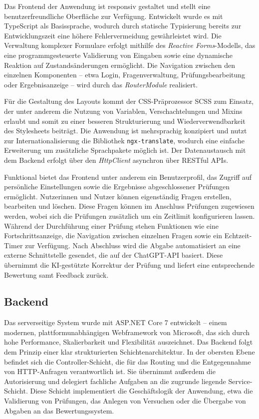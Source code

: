 \documentclass[a4paper,12pt]{article}
\begin{document}
Das Frontend der Anwendung ist responsiv gestaltet und stellt eine benutzerfreundliche Oberfläche zur Verfügung. Entwickelt wurde es mit TypeScript als Basissprache, wodurch durch statische Typisierung bereits zur Entwicklungszeit eine höhere Fehlervermeidung gewährleistet wird. Die Verwaltung komplexer Formulare erfolgt mithilfe des \textit{Reactive Forms}-Modells, das eine programmgesteuerte Validierung von Eingaben sowie eine dynamische Reaktion auf Zustandsänderungen ermöglicht. Die Navigation zwischen den einzelnen Komponenten – etwa Login, Fragenverwaltung, Prüfungsbearbeitung oder Ergebnisanzeige – wird durch das \textit{RouterModule} realisiert.

Für die Gestaltung des Layouts kommt der CSS-Präprozessor SCSS zum Einsatz, der unter anderem die Nutzung von Variablen, Verschachtelungen und Mixins erlaubt und somit zu einer besseren Strukturierung und Wiederverwendbarkeit des Stylesheets beiträgt. Die Anwendung ist mehrsprachig konzipiert und nutzt zur Internationalisierung die Bibliothek \texttt{ngx-translate}, wodurch eine einfache Erweiterung um zusätzliche Sprachpakete möglich ist. Der Datenaustausch mit dem Backend erfolgt über den \textit{HttpClient} asynchron über RESTful APIs.

Funktional bietet das Frontend unter anderem ein Benutzerprofil, das Zugriff auf persönliche Einstellungen sowie die Ergebnisse abgeschlossener Prüfungen ermöglicht. Nutzerinnen und Nutzer können eigenständig Fragen erstellen, bearbeiten und löschen. Diese Fragen können im Anschluss Prüfungen zugewiesen werden, wobei sich die Prüfungen zusätzlich um ein Zeitlimit konfigurieren lassen. Während der Durchführung einer Prüfung stehen Funktionen wie eine Fortschrittsanzeige, die Navigation zwischen einzelnen Fragen sowie ein Echtzeit-Timer zur Verfügung. Nach Abschluss wird die Abgabe automatisiert an eine externe Schnittstelle gesendet, die auf der ChatGPT-API basiert. Diese übernimmt die KI-gestützte Korrektur der Prüfung und liefert eine entsprechende Bewertung samt Feedback zurück.

\subsection{Backend}

Das serverseitige System wurde mit ASP.NET Core 7 entwickelt – einem modernen, plattformunabhängigen Webframework von Microsoft, das sich durch hohe Performance, Skalierbarkeit und Flexibilität auszeichnet. Das Backend folgt dem Prinzip einer klar strukturierten Schichtenarchitektur. In der obersten Ebene befindet sich die Controller-Schicht, die für das Routing und die Entgegennahme von HTTP-Anfragen verantwortlich ist. Sie übernimmt außerdem die Autorisierung und delegiert fachliche Aufgaben an die zugrunde liegende Service-Schicht. Diese Schicht implementiert die Geschäftslogik der Anwendung, etwa die Validierung von Prüfungen, das Anlegen von Versuchen oder die Übergabe von Abgaben an das Bewertungssystem.
\end{document}
